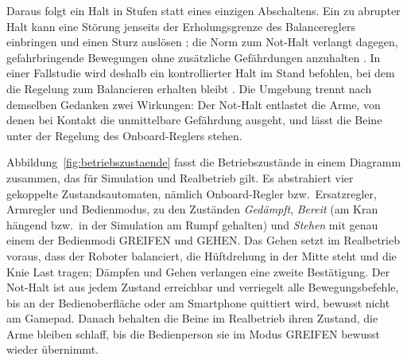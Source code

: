 Daraus folgt ein Halt in Stufen statt eines einzigen Abschaltens.
Ein zu abrupter Halt kann eine Störung jenseits der Erholungsgrenze des Balancereglers einbringen und einen Sturz auslösen \cite{Ding2026}; die Norm zum Not-Halt verlangt dagegen, gefahrbringende Bewegungen ohne zusätzliche Gefährdungen anzuhalten \cite{DINENISO13850}.
In einer Fallstudie wird deshalb ein kontrollierter Halt im Stand befohlen, bei dem die Regelung zum Balancieren erhalten bleibt \cite{Ding2026}.
Die Umgebung trennt nach demselben Gedanken zwei Wirkungen: Der Not-Halt entlastet die Arme, von denen bei Kontakt die unmittelbare Gefährdung ausgeht, und lässt die Beine unter der Regelung des Onboard-Reglers stehen.

Abbildung~\ref{fig:betriebszustaende} fasst die Betriebszustände in einem Diagramm zusammen, das für Simulation und Realbetrieb gilt.
Es abstrahiert vier gekoppelte Zustandsautomaten, nämlich Onboard-Regler bzw.\ Ersatzregler, Armregler und Bedienmodus, zu den Zuständen \emph{Gedämpft}, \emph{Bereit} (am Kran hängend bzw.\ in der Simulation am Rumpf gehalten) und \emph{Stehen} mit genau einem der Bedienmodi GREIFEN und GEHEN.
Das Gehen setzt im Realbetrieb voraus, dass der Roboter balanciert, die Hüftdrehung in der Mitte steht und die Knie Last tragen; Dämpfen und Gehen verlangen eine zweite Bestätigung.
Der Not-Halt ist aus jedem Zustand erreichbar und verriegelt alle Bewegungsbefehle, bis an der Bedienoberfläche oder am Smartphone quittiert wird, bewusst nicht am Gamepad.
Danach behalten die Beine im Realbetrieb ihren Zustand, die Arme bleiben schlaff, bis die Bedienperson sie im Modus GREIFEN bewusst wieder übernimmt.

